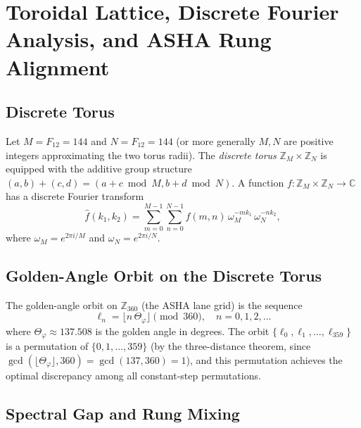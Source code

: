 \section{Toroidal Lattice, Discrete Fourier Analysis, and
  ASHA Rung Alignment}
\label{sec:ch18-discrete}

\subsection{Discrete Torus}\label{subsec:ch18-discrete-torus}

Let $M = F_{12} = 144$ and $N = F_{12} = 144$ (or more generally $M,N$ are positive
integers approximating the two torus radii).
The \emph{discrete torus} $\mathbb{Z}_M \times \mathbb{Z}_N$ is equipped with the
additive group structure $(a,b) + (c,d) = (a+c \bmod M, b+d \bmod N)$.
A function $f: \mathbb{Z}_M \times \mathbb{Z}_N \to \mathbb{C}$ has a discrete
Fourier transform
\begin{equation}\label{eq:dft-torus}
  \hat f(k_1,k_2) = \sum_{m=0}^{M-1}\sum_{n=0}^{N-1} f(m,n)\,\omega_M^{-mk_1}\,\omega_N^{-nk_2},
\end{equation}
where $\omega_M = e^{2\pi i/M}$ and $\omega_N = e^{2\pi i/N}$.

\subsection{Golden-Angle Orbit on the Discrete Torus}\label{subsec:ch18-discrete-orbit}

The golden-angle orbit on $\mathbb{Z}_{360}$ (the ASHA lane grid) is the sequence
\begin{equation}\label{eq:discrete-orbit}
  \ell_n = \lfloor n\,\Theta_\varphi \rfloor \pmod{360}, \quad n = 0,1,2,\ldots
\end{equation}
where $\Theta_\varphi \approx 137.508$ is the golden angle in degrees.
The orbit $\{\ell_0, \ell_1, \ldots, \ell_{359}\}$ is a permutation of $\{0,1,\ldots,359\}$
(by the three-distance theorem, since $\gcd(\lfloor\Theta_\varphi\rfloor, 360) = \gcd(137,360) = 1$),
and this permutation achieves the optimal discrepancy among all constant-step permutations.

\subsection{Spectral Gap and Rung Mixing}\label{subsec:ch18-spectral-gap}

